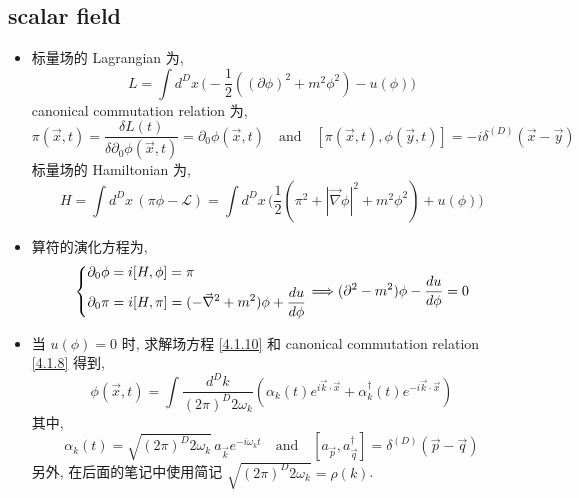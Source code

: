 \subsection{scalar field}
\begin{itemize}
	\item 标量场的 Lagrangian 为,
	\begin{equation}
		L = \int d^D x \, \Big( - \frac{1}{2} ((\partial \phi)^2 + m^2 \phi^2) - u(\phi) \Big)
	\end{equation}
	canonical commutation relation 为,
	\begin{equation} \label{4.1.8}
		\pi(\vec{x}, t) = \frac{\delta L(t)}{\delta \partial_0 \phi(\vec{x}, t)} = \partial_0 \phi(\vec{x}, t) \quad \text{and} \quad [\pi(\vec{x}, t), \phi(\vec{y}, t)] = - i \delta^{(D)}(\vec{x} - \vec{y})
	\end{equation}
	标量场的 Hamiltonian 为,
	\begin{equation} \label{4.1.9}
		H = \int d^D x \, (\pi \phi - \mathcal{L}) = \int d^D x \, \Big( \frac{1}{2} (\pi^2 + |\vec{\nabla} \phi|^2 + m^2 \phi^2) + u(\phi) \Big)
	\end{equation}
	
	\noindent\hdashrule[0.5ex]{\linewidth}{0.5pt}{1mm} %
	
	\item 算符的演化方程为,
	\begin{equation} \label{4.1.10}
		\begin{dcases}
			\partial_0 \phi = i [H, \phi] = \pi \\
			\partial_0 \pi = i [H, \pi] = (- \vec{\nabla}^2 + m^2) \phi + \frac{d u}{d\phi}
		\end{dcases} \Longrightarrow (\partial^2 - m^2) \phi - \frac{d u}{d\phi} = 0
	\end{equation}
	
	\item 当 $u(\phi) = 0$ 时, 求解场方程 \eqref{4.1.10} 和 canonical commutation relation \eqref{4.1.8} 得到,
	\begin{equation} \label{4.1.11}
		\phi(\vec{x}, t) = \int \frac{d^D k}{(2 \pi)^D 2 \omega_k} (\alpha_k(t) e^{i \vec{k} \cdot \vec{x}} + \alpha^\dag_k(t) e^{- i \vec{k} \cdot \vec{x}})
	\end{equation}
	其中,
	\begin{equation}
		\alpha_k(t) = \sqrt{(2 \pi)^D 2 \omega_k} \, a_{\vec{k}} e^{- i \omega_k t} \quad \text{and} \quad [a_{\vec{p}}, a^\dag_{\vec{q}}] = \delta^{(D)}(\vec{p} - \vec{q})
	\end{equation}
	另外, 在后面的笔记中使用简记 $\sqrt{(2 \pi)^D 2 \omega_k} = \rho(k)$.
	

\end{itemize}
